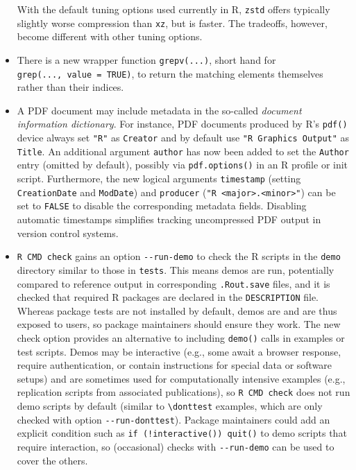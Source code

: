 \begin{itemize}
  With the default tuning options used currently in R, \texttt{zstd} offers
  typically slightly worse compression than \texttt{xz}, but is faster. The
  tradeoffs, however, become different with other tuning options.
\item
  There is a new wrapper function \texttt{grepv(...)}, short hand for
  \texttt{grep(...,\ value\ =\ TRUE)}, to return the matching elements themselves
  rather than their indices.
\item
  A PDF document may include metadata in the so-called \emph{document
  information dictionary}. For instance, PDF documents produced by R's
  \texttt{pdf()} device always set \texttt{"R"} as \texttt{Creator} and by default use
  \texttt{"R\ Graphics\ Output"} as \texttt{Title}. An additional argument \texttt{author} has
  now been added to set the \texttt{Author} entry (omitted by default), possibly
  via \texttt{pdf.options()} in an R profile or init script. Furthermore, the new
  logical arguments \texttt{timestamp} (setting \texttt{CreationDate} and \texttt{ModDate}) and
  \texttt{producer} (\texttt{"R\ \textless{}major\textgreater{}.\textless{}minor\textgreater{}"}) can be set to \texttt{FALSE} to disable the
  corresponding metadata fields. Disabling automatic timestamps simplifies
  tracking uncompressed PDF output in version control systems.
\item
  \texttt{R\ CMD\ check} gains an option \texttt{-\/-run-demo} to check the R scripts in the
  \texttt{demo} directory similar to those in \texttt{tests}. This means demos are run,
  potentially compared to reference output in corresponding \texttt{.Rout.save}
  files, and it is checked that required R packages are declared in the
  \texttt{DESCRIPTION} file. Whereas package tests are not installed by default,
  demos are and are thus exposed to users, so package maintainers should
  ensure they work. The new check option provides an alternative to including
  \texttt{demo()} calls in examples or test scripts.
  Demos may be interactive (e.g., some await a browser response, require
  authentication, or contain instructions for special data or software
  setups) and are sometimes used for computationally intensive examples
  (e.g., replication scripts from associated publications), so \texttt{R\ CMD\ check}
  does not run demo scripts by default (similar to \texttt{\textbackslash{}donttest} examples,
  which are only checked with option \texttt{-\/-run-donttest}).
  Package maintainers could add an explicit condition such as
  \texttt{if\ (!interactive())\ quit()} to demo scripts that require interaction,
  so (occasional) checks with \texttt{-\/-run-demo} can be used to cover the others.


\end{itemize}
